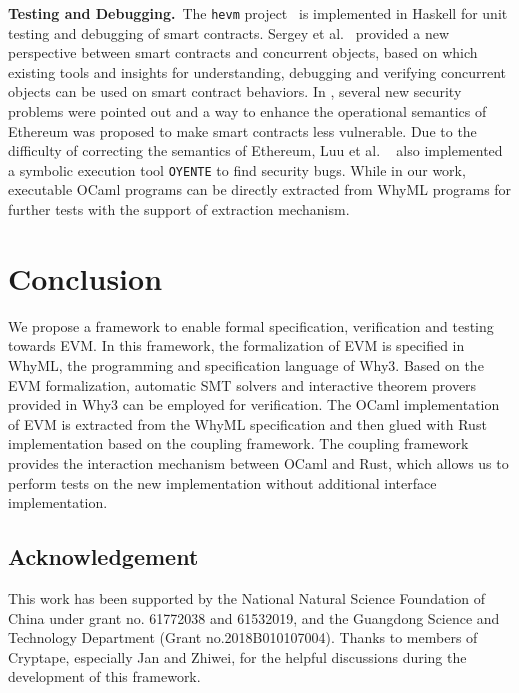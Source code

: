 \documentclass[runningheads]{llncs}
\begin{document}
\noindent\textbf{Testing and Debugging.}~The \texttt{hevm} project~\cite{hevm} is implemented in Haskell for unit testing and debugging of smart contracts.
Sergey et al.~\cite{sergey2017concurrent} provided a new perspective between smart contracts and concurrent objects,
 based on which existing tools and insights for understanding, 
 debugging and verifying concurrent objects can be used on smart contract behaviors. 
 In \cite{luu2016making}, several new security problems were pointed out and a way to enhance the operational semantics of 
 Ethereum was proposed to make smart contracts less vulnerable. 
 Due to the difficulty of correcting the semantics of Ethereum, Luu et al.
 ~\cite{luu2016making} also implemented a symbolic execution tool \texttt{OYENTE} to find security bugs.
While in our work, executable OCaml programs can be directly extracted from WhyML programs for further tests 
with the support of extraction mechanism.
 

\section{Conclusion}\label{Sec: Conclusion}
We propose a framework to enable formal specification, verification and testing towards EVM. In this framework, the formalization of EVM is specified in WhyML, the programming and specification language of Why3. Based on the EVM formalization, automatic SMT solvers and interactive theorem provers provided in Why3 can be employed for verification. The OCaml implementation of EVM is extracted from the WhyML specification and then glued with Rust implementation based on the coupling framework. The coupling framework provides the interaction mechanism between OCaml and Rust, which allows us to perform tests on the new implementation without additional interface implementation.

\subsection*{Acknowledgement}
\noindent This work has been supported by the National Natural Science Foundation of China under grant no. 61772038 and 61532019, and the Guangdong Science and Technology Department (Grant no.2018B010107004). Thanks to members of Cryptape, especially Jan and Zhiwei, for the helpful discussions during the development of this framework.




\end{document}
